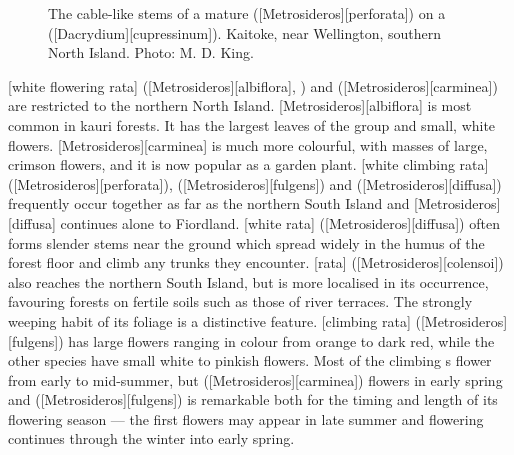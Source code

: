 {\begin{figure}[!t]
\begin{minipage}[t]{0.9\textwidth}
\begin{minipage}[t]{(\textwidth-\fgap) * \real{0.532}}
				\caption[A mature \emph{Metrosideros perforata} on a rimu]{The cable-like stems of a mature  ([Metrosideros][perforata]) on a  ([Dacrydium][cupressinum]). Kaitoke, near Wellington, southern North Island. Photo: M. D. King.}%
				\label{fig:31perforata}
			\end{minipage}
		\end{minipage}
	\end{figure}
}

[white flowering rata] ([Metrosideros][albiflora], ) and  ([Metrosideros][carminea]) are restricted to the northern North Island.
[Metrosideros][albiflora] is most common in kauri forests.
It has the largest leaves of the group and small, white flowers.
[Metrosideros][carminea] is much more colourful, with masses of large, crimson flowers, and it is now popular as a garden plant.
[white climbing rata] ([Metrosideros][perforata]),  ([Metrosideros][fulgens]) and  ([Metrosideros][diffusa]) frequently occur together as far as the northern South Island and [Metrosideros][diffusa] continues alone to Fiordland.
[white rata] ([Metrosideros][diffusa]) often forms slender stems near the ground which spread widely in the humus of the forest floor and climb any trunks they encounter.
[rata] ([Metrosideros][colensoi]) also reaches the northern South Island, but is more localised in its occurrence, favouring forests on fertile soils such as those of river terraces.
The strongly weeping habit of its foliage is a distinctive feature.
[climbing rata] ([Metrosideros][fulgens]) has large flowers ranging in colour from orange to dark red, while the other species have small white to pinkish flowers.
Most of the climbing s flower from early to mid-summer, but  ([Metrosideros][carminea]) flowers in early spring and  ([Metrosideros][fulgens]) is remarkable both for the timing and length of its flowering season --- the first flowers may appear in late summer and flowering continues through the winter into early spring.

